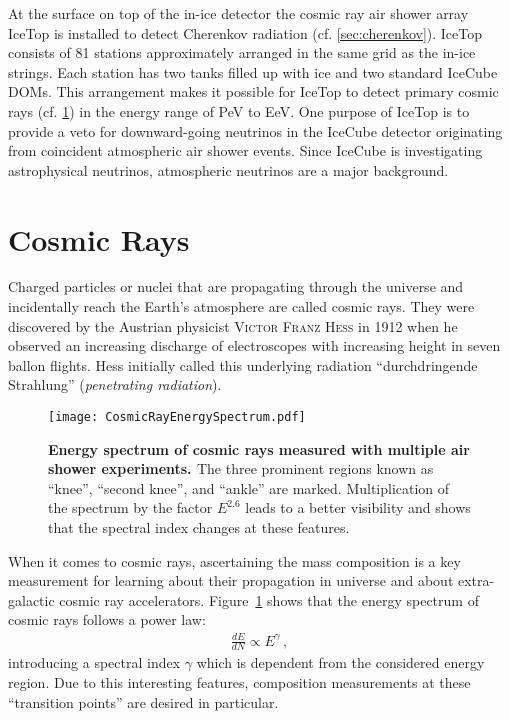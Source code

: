 At the surface on top of the in-ice detector the cosmic ray air shower array IceTop is installed to detect Cherenkov radiation (cf. \ref{sec:cherenkov}). IceTop consists of 81 stations approximately arranged in the same grid as the in-ice strings. Each station has two tanks filled up with ice and two standard IceCube DOMs. This arrangement makes it possible for IceTop to detect primary cosmic rays (cf. \ref{sec:cosmicrays}) in the energy range of \si{\peta\electronvolt} to \si{\exa\electronvolt}. One purpose of IceTop is to provide a veto for downward-going neutrinos in the IceCube detector originating from coincident atmospheric air shower events. \cite{icecube:instrumentation} Since IceCube is investigating astrophysical neutrinos, atmospheric neutrinos are a major background.


\section{Cosmic Rays}\label{sec:cosmicrays}

Charged particles or nuclei that are propagating through the universe and incidentally reach the Earth's atmosphere are called cosmic rays. They were discovered by the Austrian physicist \textsc{Victor Franz Hess} in 1912 when he observed an increasing discharge of electroscopes with increasing height in seven ballon flights. \cite{cosmicrays:hess} Hess initially called this underlying radiation \enquote{durchdringende Strahlung} (\textit{penetrating radiation}).

\begin{figure}[h]
	\texttt{[image: CosmicRayEnergySpectrum.pdf]}
	\caption[Cosmic ray energy spectrum]{\textbf{Energy spectrum of cosmic rays measured with multiple air shower experiments. \cite[adapted]{cosmicrays:gaisser}} The three prominent regions known as \enquote{knee}, \enquote{second knee}, and \enquote{ankle} are marked. Multiplication of the spectrum by the factor $E^{2.6}$ leads to a better visibility and shows that the spectral index changes at these features.}
	\label{cosmicrays:spectrum}	
\end{figure}

When it comes to cosmic rays, ascertaining the mass composition is a key measurement for learning about their propagation in universe and about extra-galactic cosmic ray accelerators. Figure~\ref{cosmicrays:spectrum} shows that the energy spectrum of cosmic rays follows a power law:
\begin{align}
\frac{dE}{dN}\propto E^\gamma\,,
\end{align}
introducing a spectral index $\gamma$ which is dependent from the considered energy region.
Due to this interesting features, composition measurements at these \enquote{transition points} are desired in particular.

